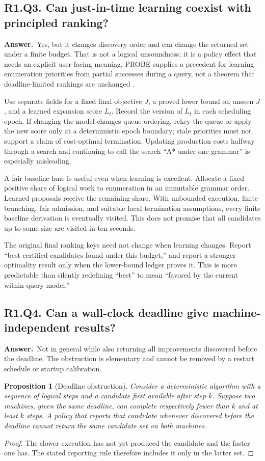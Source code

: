\documentclass[11pt,a4paper]{article}
\newtheorem{proposition}[theorem]{Proposition}
\theoremstyle{definition}
\theoremstyle{remark}
\newcommand{\answer}{\par\noindent\textbf{Answer.}\ }
\newcommand{\qheading}[2]{\subsection{#1. #2}}
\begin{document}
\qheading{R1.Q3}{Can just-in-time learning coexist with principled ranking?}
\answer Yes, but it changes discovery order and can change the returned set
under a finite budget. That is not a logical unsoundness; it is a policy effect
that needs an explicit user-facing meaning. PROBE supplies a precedent for
learning enumeration priorities from partial successes during a query, not a
theorem that deadline-limited rankings are unchanged \cite{probe}.

Use separate fields for a fixed final objective $J$, a proved lower bound on
unseen $J$, and a learned expansion score $L_t$. Record the version of $L_t$ in
each scheduling epoch. If changing the model changes queue ordering, rekey the
queue or apply the new score only at a deterministic epoch boundary; stale
priorities must not support a claim of cost-optimal termination. Updating
production costs halfway through a search and continuing to call the search
``A* under one grammar'' is especially misleading.

A fair baseline lane is useful even when learning is excellent. Allocate a
fixed positive share of logical work to enumeration in an immutable grammar
order. Learned proposals receive the remaining share. With unbounded execution,
finite branching, fair admission, and suitable local termination assumptions,
every finite baseline derivation is eventually visited. This does not promise
that all candidates up to some size are visited in ten seconds.

The original final ranking keys need not change when learning changes. Report
``best certified candidates found under this budget,'' and report a stronger
optimality result only when the lower-bound ledger proves it. This is more
predictable than silently redefining ``best'' to mean ``favored by the current
within-query model.''

\qheading{R1.Q4}{Can a wall-clock deadline give machine-independent results?}
\answer Not in general while also returning all improvements discovered before
the deadline. The obstruction is elementary and cannot be removed by a restart
schedule or startup calibration.

\begin{proposition}[Deadline obstruction]
Consider a deterministic algorithm with a sequence of logical steps and a
candidate first available after step $k$. Suppose two machines, given the same
deadline, can complete respectively fewer than $k$ and at least $k$ steps.
A policy that reports that candidate whenever discovered before the deadline
cannot return the same candidate set on both machines.
\end{proposition}
\begin{proof}
The slower execution has not yet produced the candidate and the faster one
has. The stated reporting rule therefore includes it only in the latter set.
\end{proof}
\end{document}
